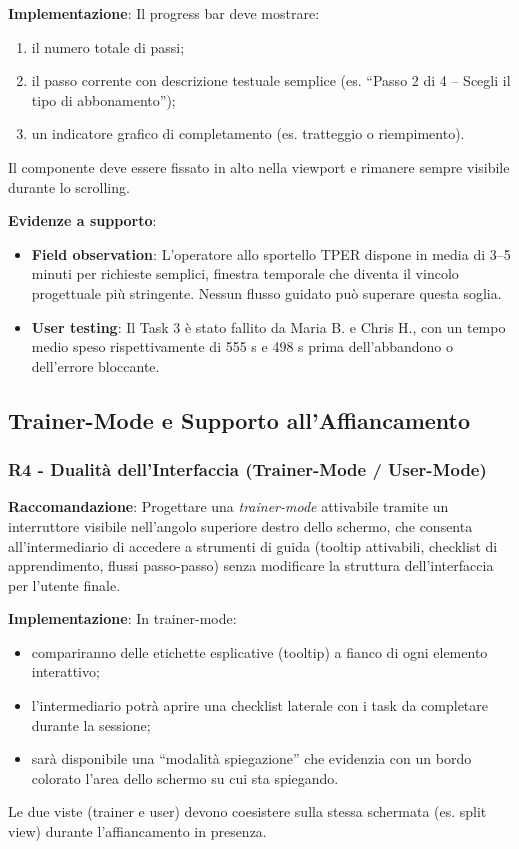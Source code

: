\documentclass[11pt,a4paper]{article}
\begin{document}
\textbf{Implementazione}: Il progress bar deve mostrare:
\begin{enumerate}
    \item il numero totale di passi;
    \item il passo corrente con descrizione testuale semplice (es.
    “Passo 2 di 4 -- Scegli il tipo di abbonamento”);
    \item un indicatore grafico di completamento (es. tratteggio o
    riempimento).
\end{enumerate}
Il componente deve essere fissato in alto nella viewport e rimanere sempre
visibile durante lo scrolling.

\textbf{Evidenze a supporto}:
\begin{itemize}
    \item \textbf{Field observation}: L'operatore allo sportello TPER dispone in media
    di 3--5 minuti per richieste semplici, finestra temporale che
    diventa il vincolo progettuale pi\`u stringente. Nessun flusso guidato pu\`o
    superare questa soglia.
    \item \textbf{User testing}: Il Task 3 \`e stato fallito da Maria B.
    e Chris H., con un tempo medio speso rispettivamente di 555 s e 498 s
    prima dell'abbandono o dell'errore bloccante.
\end{itemize}



\subsection{Trainer-Mode e Supporto all'Affiancamento}

\subsubsection{R4 - Dualit\`a dell'Interfaccia (Trainer-Mode / User-Mode)}
\label{rec:R4}

\textbf{Raccomandazione}: Progettare una \textit{trainer-mode} attivabile
tramite un interruttore visibile nell'angolo superiore destro dello schermo,
che consenta all'intermediario di accedere a strumenti di guida (tooltip
attivabili, checklist di apprendimento, flussi passo-passo) senza modificare
la struttura dell'interfaccia per l'utente finale.

\textbf{Implementazione}: In trainer-mode:
\begin{itemize}
    \item compariranno delle etichette esplicative (tooltip) a fianco di ogni
    elemento interattivo;
    \item l'intermediario potr\`a aprire una checklist laterale con i task da
    completare durante la sessione;
    \item sar\`a disponibile una “modalit\`a spiegazione” che evidenzia con un
    bordo colorato l'area dello schermo su cui sta spiegando.
\end{itemize}
Le due viste (trainer e user) devono coesistere sulla stessa schermata
(es. split view) durante l'affiancamento in presenza.
\end{document}
